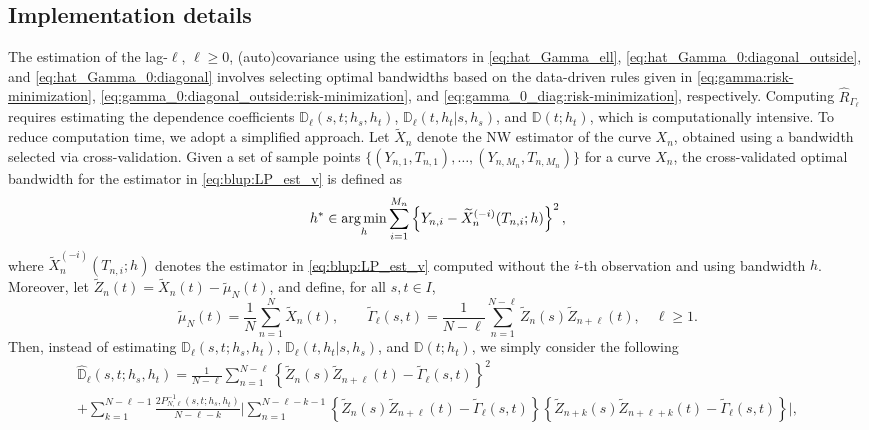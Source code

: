 \subsection{Implementation details}
The estimation of the lag-$\ell$, $\ell \geq 0$, (auto)covariance using the estimators in \eqref{eq:hat_Gamma_ell}, \eqref{eq:hat_Gamma_0:diagonal_outside}, and \eqref{eq:hat_Gamma_0:diagonal} involves selecting optimal bandwidths based on the data-driven rules given in \eqref{eq:gamma:risk-minimization}, \eqref{eq:gamma_0:diagonal_outside:risk-minimization}, and \eqref{eq:gamma_0_diag:risk-minimization}, respectively. Computing $\widehat{R}_{\Gamma_\ell}$ requires estimating the dependence coefficients $\mathbb{D}_\ell(s, t; h_s, h_t)$, $\mathbb{D}_\ell(t,h_t|s,h_s)$, and $\mathbb{D}(t; h_t)$, which is computationally intensive.
To reduce computation time, we adopt a simplified approach. Let $\widetilde{X}_n$ denote the NW estimator of the curve $X_n$, obtained using a bandwidth selected via cross-validation. Given a set of sample points $\{(Y_{n,1}, T_{n,1}), \ldots, (Y_{n,M_n}, T_{n,M_n})\}$ for a curve $X_n$, the cross-validated optimal bandwidth for the estimator in \eqref{eq:blup:LP_est_v} is defined as
\begin{equation}\label{eq:NW_bw_cv}
	h^* \in \operatorname*{arg\,min}_h \sum_{i = 1}^{M_n}\left\{Y_{n,i} - \widetilde{X}_n^{(-i)}(T_{n,i};h)\right\}^2,
\end{equation}
where $\widetilde{X}_n^{(-i)}(T_{n,i};h)$ denotes the estimator in \eqref{eq:blup:LP_est_v} computed without the $i$-th observation and using bandwidth $h$. Moreover, let $\widetilde{Z}_n(t) = \widetilde{X}_n(t) - \widetilde{\mu}_N(t)$, and define, for all $s, t \in I$,
\begin{equation*}
	\widetilde{\mu}_N(t) = \frac{1}{N} \sum_{n=1}^{N} \widetilde{X}_{n}(t), \qquad
	\widetilde{\Gamma}_\ell(s, t) = \frac{1}{N - \ell} \sum_{n = 1}^{N - \ell} \widetilde{Z}_n(s) \widetilde{Z}_{n + \ell}(t), \quad \ell \geq 1.
\end{equation*}
Then, instead of estimating $\mathbb{D}_\ell(s, t; h_s, h_t)$, $\mathbb{D}_\ell(t,h_t|s,h_s)$, and $\mathbb{D}(t; h_t)$, we simply consider the following 
\begin{multline}
	\widehat{\mathbb{D}}_\ell(s,t;h_s, h_t) 
	= \frac{1}{N-\ell} \sum_{n=1}^{N - \ell} \left\{\widetilde{Z}_n(s) \widetilde{Z}_{n + \ell}(t) - \widetilde{\Gamma}_\ell (s,t)\right\}^2 \\
	+ \!\!\!\!\sum_{k = 1}^{N-\ell - 1}\frac{2 P_{N,\ell}^{-1}(s, t; h_s, h_t)}{N - \ell - k} \Biggl|\sum_{n = 1}^{N - \ell - k - 1}\!\left\{\widetilde{Z}_n(s) \widetilde{Z}_{n + \ell}(t) - \widetilde{\Gamma}_\ell (s,t)\right\} \left\{\widetilde{Z}_{n + k}(s) \widetilde{Z}_{n + \ell + k}(t) - \widetilde{\Gamma}_\ell (s,t)\right\}\!\Biggr|,
\end{multline}
